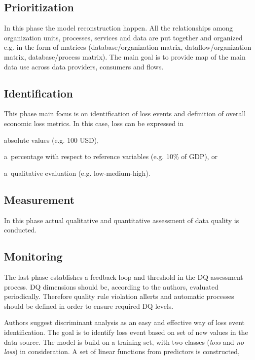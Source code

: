 \subsection{Prioritization}

In this phase the model reconstruction happen.
All the relationships among organization units, processes, services and data are put together and organized e.g. in the form of matrices (database/organization matrix, dataflow/organization matrix, database/process matrix).
The main goal is to provide map of the main data use across data providers, consumers and flows.

\subsection{Identification}

This phase main focus is on identification of loss events and definition of overall economic loss metrics.
In this case, loss can be expressed in 
\begin{enumerate*}[label=(\roman*)]
    \item absolute values (e.g. 100 USD),
    \item a~percentage with respect to reference variables (e.g. 10\% of GDP), or
    \item a~qualitative evaluation (e.g. low-medium-high).
\end{enumerate*}

\subsection{Measurement}

In this phase actual qualitative and quantitative assessment of data quality is conducted.

\subsection{Monitoring}

The last phase establishes a feedback loop and threshold in the DQ assessment process.
DQ dimensions should be, according to the authors, evaluated periodically.
Therefore quality rule violation allerts and automatic processes should be defined in order to ensure required DQ levels.

Authors suggest discriminant analysis as an easy and effective way of loss event identification.
The goal is to identify loss event based on set of new values in the data source.
The model is build on a training set, with two classes (\textit{loss} and \textit{no loss}) in consideration.
A set of linear functions from predictors is constructed,

